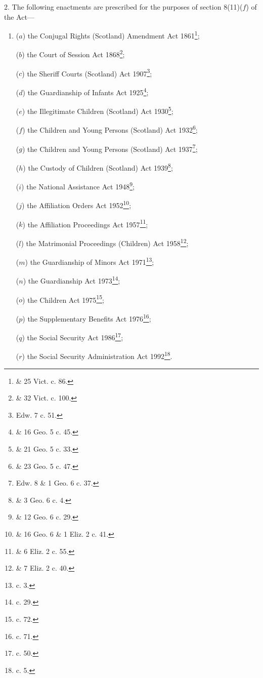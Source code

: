 \documentclass[12pt,a4paper]{article}
\begin{document}
2.  The following enactments are prescribed for the purposes of section 8(11)($f$) of the Act—
\begin{enumerate}\item[]
($a$) the Conjugal Rights (Scotland) Amendment Act 1861\footnote{ \& 25 Vict. c. 86.};

($b$) the Court of Session Act 1868\footnote{ \& 32 Vict. c. 100.};

($c$) the Sheriff Courts (Scotland) Act 1907\footnote{ Edw. 7 c. 51.};

($d$) the Guardianship of Infants Act 1925\footnote{ \& 16 Geo. 5 c. 45.};

($e$) the Illegitimate Children (Scotland) Act 1930\footnote{ \& 21 Geo. 5 c. 33.};

($f$) the Children and Young Persons (Scotland) Act 1932\footnote{ \& 23 Geo. 5 c. 47.};

($g$) the Children and Young Persons (Scotland) Act 1937\footnote{ Edw. 8 \& 1 Geo. 6 c. 37.};

($h$) the Custody of Children (Scotland) Act 1939\footnote{ \& 3 Geo. 6 c. 4.};

($i$) the National Assistance Act 1948\footnote{ \& 12 Geo. 6 c. 29.};

($j$) the Affiliation Orders Act 1952\footnote{ \& 16 Geo. 6 \& 1 Eliz. 2 c. 41.};

($k$) the Affiliation Proceedings Act 1957\footnote{ \& 6 Eliz. 2 c. 55.};

($l$) the Matrimonial Proceedings (Children) Act 1958\footnote{ \& 7 Eliz. 2 c. 40.};

($m$) the Guardianship of Minors Act 1971\footnote{ c. 3.};

($n$) the Guardianship Act 1973\footnote{ c. 29.};

($o$) the Children Act 1975\footnote{ c. 72.};

($p$) the Supplementary Benefits Act 1976\footnote{ c. 71.};

($q$) the Social Security Act 1986\footnote{ c. 50.};

($r$) the Social Security Administration Act 1992\footnote{ c. 5.}.
\end{enumerate}
\end{document}
